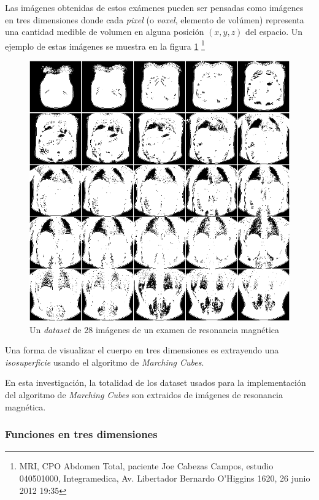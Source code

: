 Las imágenes obtenidas de estos exámenes pueden ser pensadas como imágenes en tres dimensiones donde cada \emph{pixel} (o \emph{voxel}, elemento de volúmen) representa una cantidad medible de volumen en alguna posición $(x, y, z)$ del espacio. Un ejemplo de estas imágenes se muestra en la figura \ref{f:flujoDeTrabajo:mri_joe} \footnote{MRI, CPO Abdomen Total, paciente Joe Cabezas Campos, estudio 040501000, Integramedica, Av. Libertador Bernardo O'Higgins 1620, 26 junio 2012 19:35}

\begin{figure}[p]
\centering
	\includegraphics[width=1.0\textwidth]{images/misc/mri_joe.png}
\caption{Un \emph{dataset} de 28 imágenes de un examen de resonancia magnética}
\label{f:flujoDeTrabajo:mri_joe}
\end{figure}

Una forma de visualizar el cuerpo en tres dimensiones es extrayendo una \emph{isosuperficie} usando el algoritmo de \emph{Marching Cubes}.

En esta investigación, la totalidad de los dataset usados para la implementación del algoritmo de \emph{Marching Cubes} son extraidos de imágenes de resonancia magnética.
\newpage

\subsubsection{Funciones en tres dimensiones}
\label{ch:propuesta:sec:extraccionDeDatos:subsec:funcionesEnTresDimensiones}

